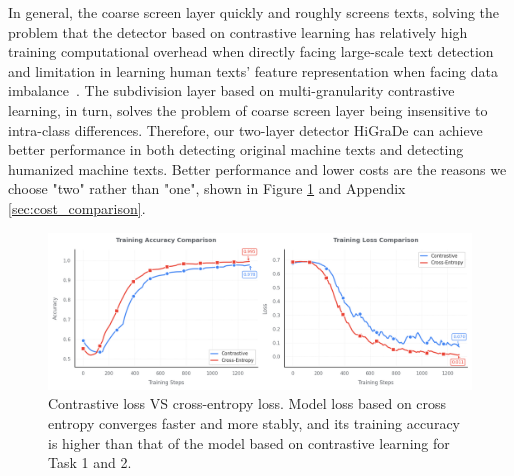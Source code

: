 \documentclass[11pt]{article}
\newcommand{\greenCitep}[1]{\textcolor{darkgreen}{\citep{#1}}}
\begin{document}
	In general, the coarse screen layer quickly and roughly screens texts, solving the problem that the detector based on contrastive learning has relatively high training computational overhead when directly facing large-scale text detection and limitation in learning human texts' feature representation when facing data imbalance~\greenCitep{liu2016largemarginsoftmax,sohn2016contrasive}. The subdivision layer based on multi-granularity contrastive learning, in turn, solves the problem of coarse screen layer being insensitive to intra-class differences. Therefore, our two-layer detector HiGraDe can achieve better performance in both detecting original machine texts and detecting humanized machine texts. Better performance and lower costs are the reasons we choose "two" rather than "one", shown in Figure \ref{fig:loss_compare} and Appendix \ref{sec:cost_comparison}.

	\begin{figure}
		\centering
		\includegraphics[width=0.9\linewidth]{pics/loss_vs.png}
		\caption{Contrastive loss VS cross-entropy loss. Model loss based on cross entropy converges faster and more stably, and its training accuracy is higher than that of the model based on contrastive learning for Task 1 and 2.}
	\label{fig:loss_compare}
	\end{figure}
	
\end{document}
